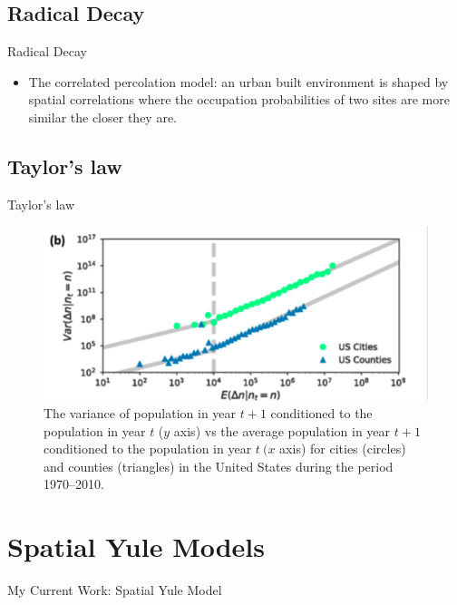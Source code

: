 \documentclass{beamer}
\begin{document}
\subsection{Radical Decay}
\begin{frame}{Radical Decay}
  \begin{itemize}
    \item The correlated percolation model: an urban built environment is shaped by spatial correlations where the occupation probabilities of two sites are more similar the closer they are.
  \end{itemize}
\end{frame}

\subsection{Taylor's law}

  \begin{frame}{Taylor's law}
    \begin{figure}
      \centering
      \includegraphics[width = 0.5\linewidth]{pics/taylor's.png}
      \caption{The variance of population in year $t+1$ conditioned to the population in year $t$ ($y$ axis) vs the average population in year $t+1$ conditioned to the population in year $t\ (x$
       axis) for cities (circles) and counties (triangles) in the United States during the period 1970–2010.}
    \end{figure}
  \end{frame}


\section{Spatial Yule Models}

\begin{frame}{My Current Work: Spatial Yule Model}
  
\end{frame}
\end{document}
